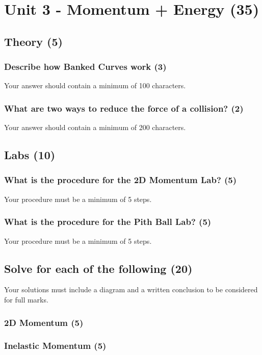 \documentclass{article}
\begin{document}
\section{Unit 3 - Momentum + Energy (35)}
\subsection{Theory (5)}
\subsubsection{Describe how Banked Curves work (3)}
Your answer should contain a minimum of 100 characters.

\subsubsection{What are two ways to reduce the force of a collision? (2)}
Your answer should contain a minimum of 200 characters.

\subsection{Labs (10)}
\subsubsection{What is the procedure for the 2D Momentum Lab? (5)}
Your procedure must be a minimum of 5 steps.

\subsubsection{What is the procedure for the Pith Ball Lab? (5)}
Your procedure must be a minimum of 5 steps.

\subsection{Solve for each of the following (20)}
Your solutions must include a diagram and a written conclusion to be considered for full marks.

\subsubsection{2D Momentum (5)}
\subsubsection{Inelastic Momentum (5)}
\end{document}
